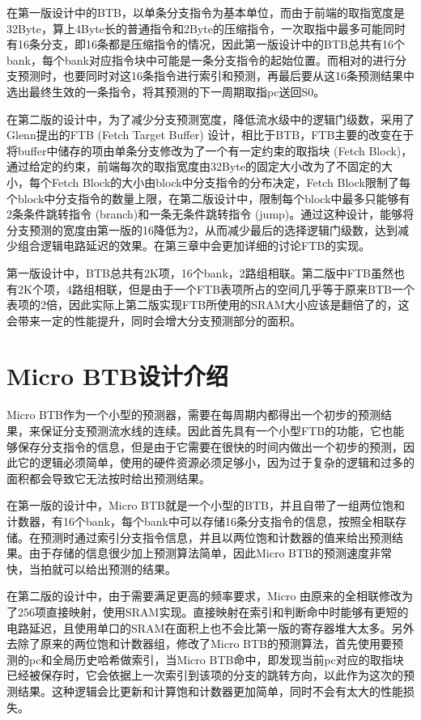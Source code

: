 在第一版设计中的BTB，以单条分支指令为基本单位，而由于前端的取指宽度是32Byte，算上4Byte长的普通指令和2Byte的压缩指令，一次取指中最多可能同时有16条分支，即16条都是压缩指令的情况，因此第一版设计中的BTB总共有16个bank，每个bank对应指令块中可能是一条分支指令的起始位置。而相对的进行分支预测时，也要同时对这16条指令进行索引和预测，再最后要从这16条预测结果中选出最终生效的一条指令，将其预测的下一周期取指pc送回S0。

在第二版的设计中，为了减少分支预测宽度，降低流水级中的逻辑门级数，采用了Glenn提出的FTB (Fetch Target Buffer) 设计\cite{scalable-frontend}，相比于BTB，FTB主要的改变在于将buffer中储存的项由单条分支修改为了一个有一定约束的取指块 (Fetch Block)，通过给定的约束，前端每次的取指宽度由32Byte的固定大小改为了不固定的大小，每个Fetch Block的大小由block中分支指令的分布决定，Fetch Block限制了每个block中分支指令的数量上限，在第二版设计中，限制每个block中最多只能够有2条条件跳转指令 (branch)和一条无条件跳转指令 (jump)。通过这种设计，能够将分支预测的宽度由第一版的16降低为2，从而减少最后的选择逻辑门级数，达到减少组合逻辑电路延迟的效果。在第三章中会更加详细的讨论FTB的实现。

第一版设计中，BTB总共有2K项，16个bank，2路组相联。第二版中FTB虽然也有2K个项，4路组相联，但是由于一个FTB表项所占的空间几乎等于原来BTB一个表项的2倍，因此实际上第二版实现FTB所使用的SRAM大小应该是翻倍了的，这会带来一定的性能提升，同时会增大分支预测部分的面积。

\section{Micro BTB设计介绍}

Micro BTB作为一个小型的预测器，需要在每周期内都得出一个初步的预测结果，来保证分支预测流水线的连续。因此首先具有一个小型FTB的功能，它也能够保存分支指令的信息，但是由于它需要在很快的时间内做出一个初步的预测，因此它的逻辑必须简单，使用的硬件资源必须足够小，因为过于复杂的逻辑和过多的面积都会导致它无法按时给出预测结果。

在第一版的设计中，Micro BTB就是一个小型的BTB，并且自带了一组两位饱和计数器，有16个bank，每个bank中可以存储16条分支指令的信息，按照全相联存储。在预测时通过索引分支指令信息，并且以两位饱和计数器的值来给出预测结果。由于存储的信息很少加上预测算法简单，因此Micro BTB的预测速度非常快，当拍就可以给出预测的结果。

在第二版的设计中，由于需要满足更高的频率要求，Micro 由原来的全相联修改为了256项直接映射，使用SRAM实现。直接映射在索引和判断命中时能够有更短的电路延迟，且使用单口的SRAM在面积上也不会比第一版的寄存器堆大太多。另外去除了原来的两位饱和计数器组，修改了Micro BTB的预测算法，首先使用要预测的pc和全局历史哈希做索引，当Micro BTB命中，即发现当前pc对应的取指块已经被保存时，它会依据上一次索引到该项的分支的跳转方向，以此作为这次的预测结果。这种逻辑会比更新和计算饱和计数器更加简单，同时不会有太大的性能损失。

